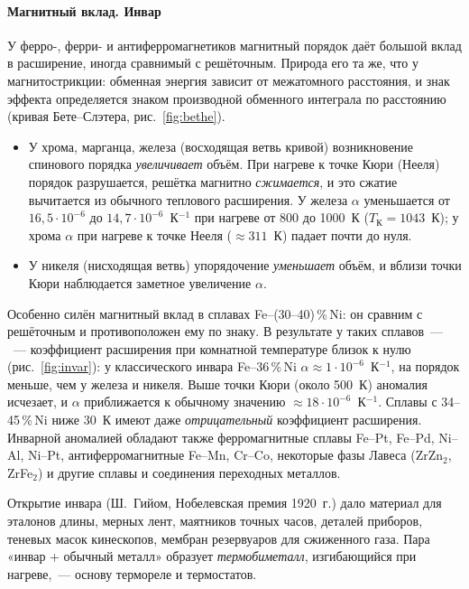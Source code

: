 \paragraph{Магнитный вклад. Инвар}
У ферро-, ферри- и антиферромагнетиков магнитный порядок даёт большой
вклад в расширение, иногда сравнимый с решёточным. Природа его та же, что
у магнитострикции: обменная энергия зависит от межатомного расстояния,
и знак эффекта определяется знаком производной обменного интеграла по
расстоянию (кривая Бете--Слэтера, рис.~\ref{fig:bethe}).
\begin{itemize}
\item У хрома, марганца, железа (восходящая ветвь кривой) возникновение
спинового порядка \emph{увеличивает} объём. При нагреве к точке Кюри (Нееля)
порядок разрушается, решётка магнитно \emph{сжимается}, и это сжатие
вычитается из обычного теплового расширения. У железа $\alpha$ уменьшается
от $16{,}5\cdot10^{-6}$ до $14{,}7\cdot10^{-6}$~К$^{-1}$ при нагреве от 800 до
1000~К ($T_\text{К}=1043$~К); у хрома $\alpha$ при нагреве к точке Нееля
(${\approx}311$~К) падает почти до нуля.
\item У никеля (нисходящая ветвь) упорядочение \emph{уменьшает} объём, и
вблизи точки Кюри наблюдается заметное увеличение $\alpha$.
\end{itemize}

Особенно силён магнитный вклад в сплавах Fe--(30--40)\,\%\,Ni: он сравним с
решёточным и противоположен ему по знаку. В результате у таких сплавов~—
~— коэффициент расширения при комнатной температуре близок
к нулю (рис.~\ref{fig:invar}): у классического инвара Fe--36\,\%\,Ni
$\alpha\approx1\cdot10^{-6}$~К$^{-1}$, на порядок меньше, чем у железа и
никеля. Выше точки Кюри (около 500~К) аномалия исчезает, и $\alpha$
приближается к обычному значению ${\approx}18\cdot10^{-6}$~К$^{-1}$. Сплавы
с 34--45\,\%\,Ni ниже 30~К имеют даже \emph{отрицательный} коэффициент
расширения. Инварной аномалией обладают также ферромагнитные сплавы
Fe--Pt, Fe--Pd, Ni--Al, Ni--Pt, антиферромагнитные Fe--Mn, Cr--Co,
некоторые фазы Лавеса (ZrZn$_2$, ZrFe$_2$) и другие сплавы и соединения
переходных металлов.

\begin{primer*}
Открытие инвара (Ш.~Гийом, Нобелевская премия 1920~г.) дало материал для
эталонов длины, мерных лент, маятников точных часов, деталей приборов,
теневых масок кинескопов, мембран резервуаров для сжиженного газа.
Пара «инвар + обычный металл» образует \emph{термобиметалл}, изгибающийся
при нагреве,~— основу термореле и термостатов.
\end{primer*}

